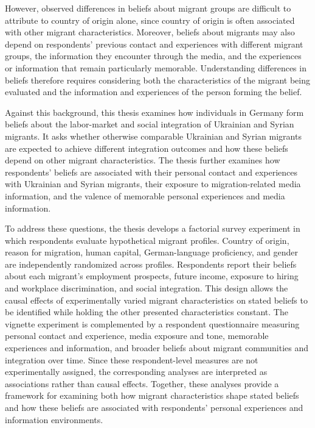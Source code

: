 However, observed differences in beliefs about migrant groups are difficult to attribute to country of origin alone, 
since country of origin is often associated with other migrant characteristics. Moreover, beliefs about migrants may also
depend on respondents' previous contact and experiences with different migrant groups, the information they encounter 
through the media, and the experiences or information that remain particularly memorable. Understanding differences in 
beliefs therefore requires considering both the characteristics of the migrant being evaluated and the information and 
experiences of the person forming the belief.

Against this background, this thesis examines how individuals in Germany form beliefs about the labor-market and social 
integration of Ukrainian and Syrian migrants. It asks whether otherwise comparable Ukrainian and Syrian migrants are 
expected to achieve different integration outcomes and how these beliefs depend on other migrant characteristics. 
The thesis further examines how respondents' beliefs are associated with their personal contact and experiences with 
Ukrainian and Syrian migrants, their exposure to migration-related media information, and the valence of memorable 
personal experiences and media information.

To address these questions, the thesis develops a factorial survey experiment in which respondents evaluate hypothetical 
migrant profiles. Country of origin, reason for migration, human capital, German-language proficiency, and gender are 
independently randomized across profiles. Respondents report their beliefs about each migrant's employment prospects, 
future income, exposure to hiring and workplace discrimination, and social integration. This design allows the causal 
effects of experimentally varied migrant characteristics on stated beliefs to be identified while holding the other 
presented characteristics constant. The vignette experiment is complemented by a respondent questionnaire measuring 
personal contact and experience, media exposure and tone, memorable experiences and information, and broader beliefs about 
migrant communities and integration over time. Since these respondent-level measures are not experimentally assigned, 
the corresponding analyses are interpreted as associations rather than causal effects. Together, these analyses provide 
a framework for examining both how migrant characteristics shape stated beliefs and how these beliefs are associated 
with respondents' personal experiences and information environments.

